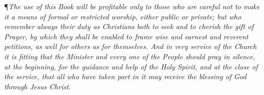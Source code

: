 \noindent\P \textit{The use of this Book will be profitable only to those who are careful not to make it a means of formal or restricted worship, either public or private; but who remember always their duty as Christians both to seek and to cherish the gift of Prayer, by which they shall be enabled to frame wise and earnest and reverent petitions, as well for others as for themselves.
And in very service of the Church it is fitting that the Minister and every one of the People should pray in silence, at the beginning, for the guidance and help of the Holy Spirit, and at the close of the service, that all who have taken part in it may receive the blessing of God through Jesus Christ.} \\
